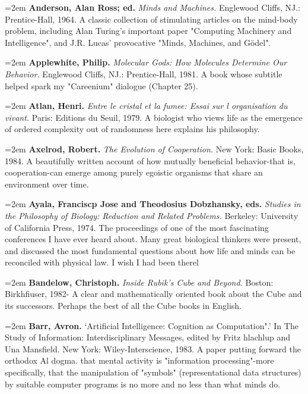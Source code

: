 \par\noindent\hangindent=2em {\bf Anderson, Alan Ross; ed.} {\it Minds and Machines.} Englewood Cliffs, NJ.: Prentice-Hall, 1964. A classic collection of stimulating articles on the mind-body problem, including Alan Turing's important paper "Computing Machinery and Intelligence", and J.R. Lucas' provocative "Minds, Machines, and Gödel".

\par\noindent\hangindent=2em {\bf Applewhite, Philip.} {\it Molecular Gods: How Molecules Determine Our Behavior.} Englewood Cliffs, NJ.: Prentice-Hall, 1981. A book whose subtitle helped spark my "Careenium" dialogue (Chapter 25).

\par\noindent\hangindent=2em {\bf Atlan, Henri.} {\it Entre le cristal et la fumee: Essai sur l organisation du vivant.} Paris: Editions du Seuil, 1979. A biologist who views life as the emergence of ordered complexity out of randomness here explains his philosophy.

\par\noindent\hangindent=2em {\bf Axelrod, Robert.} {\it The Evolution of Cooperation.} New York: Basic Books, 1984. A beautifully written account of how mutually beneficial behavior-that is, cooperation-can emerge among purely egoistic organisms that share an environment over time.

\par\noindent\hangindent=2em {\bf Ayala, Franciscp Jose and Theodosius Dobzhansky, eds.} {\it Studies in the Philosophy of Biology: Reduction and Related Problems.} Berkeley: University of California Press, 1974. The proceedings of one of the most fascinating conferences I have ever heard about. Many great biological thinkers were present, and discussed the most fundamental questions about how life and minds can be reconciled with physical law. I wish I had been therel

\par\noindent\hangindent=2em {\bf Bandelow, Christoph.} {\it Inside Rubik's Cube and Beyond.} Boston: Birkhfiuser, 1982- A clear and mathematically oriented book about the Cube and its successors. Perhaps the best of all the Cube books in English.

\par\noindent\hangindent=2em {\bf Barr, Avron.} `Artificial Intelligence: Cognition as Computation".' In The Study of Information: Interdisciplinary Messages, edited by Fritz hlachlup and Una Mansfield. New York: Wiley-Interscience, 1983. A paper putting forward the orthodox Al dogma. that mental activity is "information processing"-more specifically, that the manipulation of "symbols" (representational data structures) by suitable computer programs is no more and no less than what minds do.

